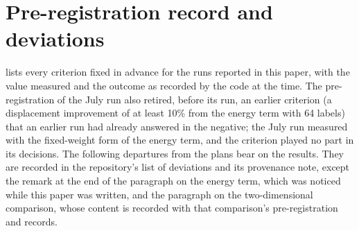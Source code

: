 \section{Pre-registration record and deviations}\label{app:prereg}
\setcounter{table}{0}\setcounter{figure}{0}\setcounter{equation}{0}



 lists every criterion fixed in advance for the runs reported in this
paper, with the value measured and the outcome as recorded by the code at the time. The
pre-registration of the July run also retired, before its run, an earlier criterion (a
displacement improvement of at least 10\% from the energy term with 64 labels) that an
earlier run had already answered in the negative; the July run measured \numGOneRetired{}
with the fixed-weight form of the energy term, and the criterion played no part in its
decisions. The following departures from the plans bear on the results. They are recorded
in the repository's list of deviations and its provenance note, except the remark at the
end of the paragraph on the energy term, which was noticed while this paper was written,
and the paragraph on the two-dimensional comparison, whose content is recorded with that
comparison's pre-registration and records.

